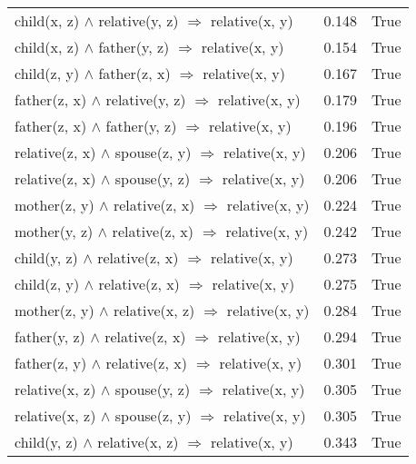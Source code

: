 \begin{longtable}{lrl}
   child(x, z) $\wedge$ relative(y, z)   $\Rightarrow$ relative(x, y) &           0.148 &                     True \\
     child(x, z) $\wedge$ father(y, z)   $\Rightarrow$ relative(x, y) &           0.154 &                     True \\
     child(z, y) $\wedge$ father(z, x)   $\Rightarrow$ relative(x, y) &           0.167 &                     True \\
  father(z, x) $\wedge$ relative(y, z)   $\Rightarrow$ relative(x, y) &           0.179 &                     True \\
    father(z, x) $\wedge$ father(y, z)   $\Rightarrow$ relative(x, y) &           0.196 &                     True \\
  relative(z, x) $\wedge$ spouse(z, y)   $\Rightarrow$ relative(x, y) &           0.206 &                     True \\
  relative(z, x) $\wedge$ spouse(y, z)   $\Rightarrow$ relative(x, y) &           0.206 &                     True \\
  mother(z, y) $\wedge$ relative(z, x)   $\Rightarrow$ relative(x, y) &           0.224 &                     True \\
  mother(y, z) $\wedge$ relative(z, x)   $\Rightarrow$ relative(x, y) &           0.242 &                     True \\
   child(y, z) $\wedge$ relative(z, x)   $\Rightarrow$ relative(x, y) &           0.273 &                     True \\
   child(z, y) $\wedge$ relative(z, x)   $\Rightarrow$ relative(x, y) &           0.275 &                     True \\
  mother(z, y) $\wedge$ relative(x, z)   $\Rightarrow$ relative(x, y) &           0.284 &                     True \\
  father(y, z) $\wedge$ relative(z, x)   $\Rightarrow$ relative(x, y) &           0.294 &                     True \\
  father(z, y) $\wedge$ relative(z, x)   $\Rightarrow$ relative(x, y) &           0.301 &                     True \\
  relative(x, z) $\wedge$ spouse(y, z)   $\Rightarrow$ relative(x, y) &           0.305 &                     True \\
  relative(x, z) $\wedge$ spouse(z, y)   $\Rightarrow$ relative(x, y) &           0.305 &                     True \\
   child(y, z) $\wedge$ relative(x, z)   $\Rightarrow$ relative(x, y) &           0.343 &                     True \\

\end{longtable}
